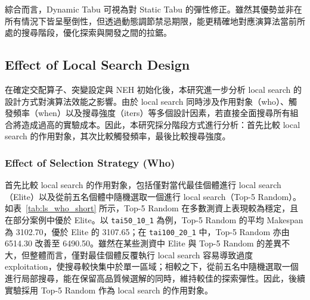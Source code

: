 \documentclass[conference]{IEEEtran}
\begin{document}
綜合而言，Dynamic Tabu 可視為對 Static Tabu 的彈性修正。雖然其優勢並非在所有情況下皆呈壓倒性，但透過動態調節禁忌期限，能更精確地對應演算法當前所處的搜尋階段，優化探索與開發之間的拉鋸。

\subsection{Effect of Local Search Design}
在確定交配算子、突變設定與 NEH 初始化後，本研究進一步分析 local search 的設計方式對演算法效能之影響。由於 local search 同時涉及作用對象（who）、觸發頻率（when）以及搜尋強度（iters）等多個設計因素，若直接全面搜尋所有組合將造成過高的實驗成本。因此，本研究採分階段方式進行分析：首先比較 local search 的作用對象，其次比較觸發頻率，最後比較搜尋強度。

\subsubsection{Effect of Selection Strategy (Who)}
首先比較 local search 的作用對象，包括僅對當代最佳個體進行 local search（Elite）以及從前五名個體中隨機選取一個進行 local search（Top-5 Random）。如表~\ref{tab:ls_who_short} 所示，Top-5 Random 在多數測資上表現較為穩定，且在部分案例中優於 Elite。以 \texttt{tai50\_10\_1} 為例，Top-5 Random 的平均 Makespan 為 3102.70，優於 Elite 的 3107.65；在 \texttt{tai100\_20\_1} 中，Top-5 Random 亦由 6514.30 改善至 6490.50。雖然在某些測資中 Elite 與 Top-5 Random 的差異不大，但整體而言，僅對最佳個體反覆執行 local search 容易導致過度 exploitation，使搜尋較快集中於單一區域；相較之下，從前五名中隨機選取一個進行局部搜尋，能在保留高品質候選解的同時，維持較佳的探索彈性。因此，後續實驗採用 Top-5 Random 作為 local search 的作用對象。
\end{document}
